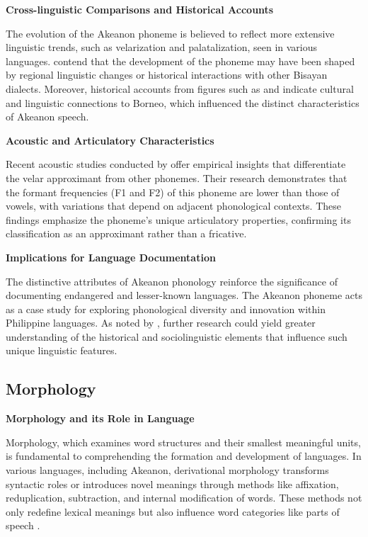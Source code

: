 \textbf{Cross-linguistic Comparisons and Historical Accounts}
  
The evolution of the Akeanon phoneme is believed to reflect more extensive linguistic trends, such as velarization and palatalization, seen in various languages.  contend that the development of the phoneme may have been shaped by regional linguistic changes or historical interactions with other Bisayan dialects. Moreover, historical accounts from figures such as  and  indicate cultural and linguistic connections to Borneo, which influenced the distinct characteristics of Akeanon speech.

\textbf{Acoustic and Articulatory Characteristics}  

Recent acoustic studies conducted by  offer empirical insights that differentiate the velar approximant from other phonemes. Their research demonstrates that the formant frequencies (F1 and F2) of this phoneme are lower than those of vowels, with variations that depend on adjacent phonological contexts. These findings emphasize the phoneme's unique articulatory properties, confirming its classification as an approximant rather than a fricative.

\textbf{Implications for Language Documentation}  

The distinctive attributes of Akeanon phonology reinforce the significance of documenting endangered and lesser-known languages. The Akeanon phoneme acts as a case study for exploring phonological diversity and innovation within Philippine languages. As noted by , further research could yield greater understanding of the historical and sociolinguistic elements that influence such unique linguistic features.

\subsection{Morphology}

\textbf{Morphology and its Role in Language}

Morphology, which examines word structures and their smallest meaningful units, is fundamental to comprehending the formation and development of languages. In various languages, including Akeanon, derivational morphology transforms syntactic roles or introduces novel meanings through methods like affixation, reduplication, subtraction, and internal modification of words. These methods not only redefine lexical meanings but also influence word categories like parts of speech .

